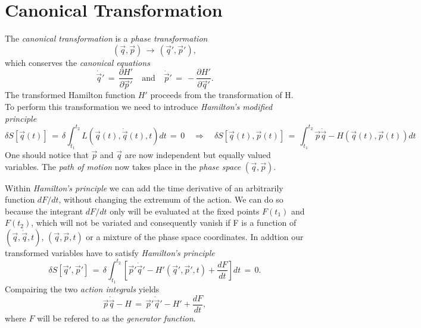 \section{Canonical Transformation}
The \textit{canonical transformation} is a \textit{phase transformation}
\begin{equation}
  (\vec q, \vec p) \,\to\, (\vec q', \vec p'),
\end{equation}
which conserves the \textit{canonical equations} 
\begin{equation}
  \dot{\vec q}' \,=\, \frac{\partial H'}{\partial \vec p'} \quad \text{and}
\quad \dot{\vec p}' \,=\, - \frac{\partial H'}{\partial \vec q'}.
\end{equation}
The transformed Hamilton function $H'$ proceeds from the transformation of H.
To perform this transformation we need to introduce \textit{Hamilton's modified
principle}
\begin{equation}
 \delta S[\vec q(t)] \,=\, \delta \int_{t_1}^{t_2} L(\vec q(t), \dot{\vec
q}(t), t) dt \,=\, 0 \quad \Rightarrow \quad \delta S [\vec q(t), \vec p(t)]
\,=\, \int_{t_1}^{t_2} \vec p \dot{\vec q} - H(\vec q(t), \vec p(t)) dt 
\end{equation}
One should notice that $\vec p$ and $\vec q$ are now independent but equally
valued variables. The \textit{path of motion} now takes place in the
\textit{phase space} $(\vec q, \vec p)$. 

Within \textit{Hamilton's principle} we can add the time derivative of an
arbitrarily function $dF/dt$, without changing the extremum of the action. We
can do so because the integrant $dF/dt$ only will be evaluated at the fixed
points $F(t_1)$ and $F(t_2)$, which will not be variated and consequently
vanish if F is a function of $(\vec q, \dot{\vec q}, t)$, $(\vec q, \vec p, t)$
or a mixture of the phase space coordinates. In addtion our transformed
variables have to satisfy \textit{Hamilton's principle}
\begin{equation} 
  \delta S[\vec q', \vec p'] \,=\, \delta \int_{t_1}^{t_2} \left[ \vec p' \dot{\vec
q}' - H'(\vec q', \vec p', t) + \frac{dF}{dt} \right] dt \,=\, 0.
\end{equation}
Compairing the two \textit{action integrals} yields
\begin{equation}
  \label{canonicalEquationCondition}
  \vec p \dot{\vec q} - H \,=\, \vec p' \dot{\vec q}' - H' + \frac{dF}{dt},
\end{equation}
where $F$ will be refered to as the \textit{generator function}. 


